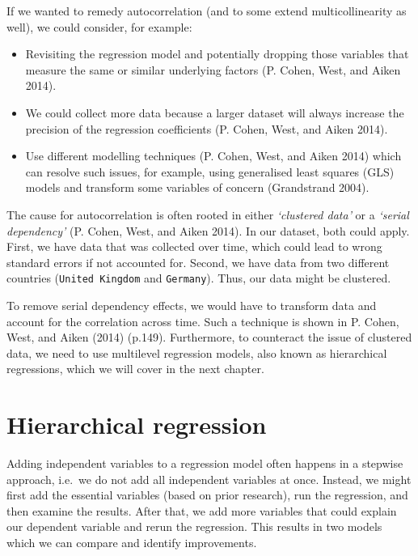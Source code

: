 \documentclass[
  letterpaper,
  DIV=11,
  numbers=noendperiod]{scrreprt}
\begin{document}
If we wanted to remedy autocorrelation (and to some extend
multicollinearity as well), we could consider, for example:

\begin{itemize}
\item
  Revisiting the regression model and potentially dropping those
  variables that measure the same or similar underlying factors (P.
  Cohen, West, and Aiken 2014).
\item
  We could collect more data because a larger dataset will always
  increase the precision of the regression coefficients (P. Cohen, West,
  and Aiken 2014).
\item
  Use different modelling techniques (P. Cohen, West, and Aiken 2014)
  which can resolve such issues, for example, using generalised least
  squares (GLS) models and transform some variables of concern
  (Grandstrand 2004).
\end{itemize}

The cause for autocorrelation is often rooted in either \emph{`clustered
data'} or a \emph{`serial dependency'} (P. Cohen, West, and Aiken 2014).
In our dataset, both could apply. First, we have data that was collected
over time, which could lead to wrong standard errors if not accounted
for. Second, we have data from two different countries
(\texttt{United\ Kingdom} and \texttt{Germany}). Thus, our data might be
clustered.

To remove serial dependency effects, we would have to transform data and
account for the correlation across time. Such a technique is shown in P.
Cohen, West, and Aiken (2014) (p.149). Furthermore, to counteract the
issue of clustered data, we need to use multilevel regression models,
also known as hierarchical regressions, which we will cover in the next
chapter.

\section{Hierarchical regression}\label{sec-hierarchical-regression}

Adding independent variables to a regression model often happens in a
stepwise approach, i.e.~we do not add all independent variables at once.
Instead, we might first add the essential variables (based on prior
research), run the regression, and then examine the results. After that,
we add more variables that could explain our dependent variable and
rerun the regression. This results in two models which we can compare
and identify improvements.
\end{document}
